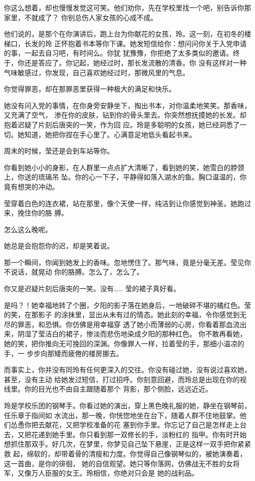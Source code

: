 		你这么想着，却也慢慢发觉这可笑。他们劝你，先在学校里找一个吧，别告诉你那家里，不就成了？
	你别总伤人家女孩的心成不成。

		他们说的，是那个在你演讲后，跑上台为你献花的女孩，玲。这一刻，在初冬的楼梯口，长发的玲
	正怀抱着书本等你下课。她发短信给你：想问问你关于入党申请的事，一起去自习吧，有时间么。你犹
	犹豫豫，你拒绝了太多类似的邀请。终于，你还是答应了。你记起，她经过时，那长发流散的清香。你
	没有这样对一种气味敏感过，你发现，自己喜欢她经过时，那微风里的气息。


		你觉得罪恶，却在那罪恶里获得一种极大的满足和快乐。


		她没有问入党的事情，在你身旁安静坐下，掏出书本，对你温柔地笑笑。那香味，又充满了空气，
	渗在你的皮肤，钻到你的骨头里去。你突然想抚摸她的长发。却抱着迟疑了片刻后唐突的一笑，作为回
	应。玲是多聪明的女孩，她已经洞悉了一切。她知道，她把你捏在手心里了。心满意足地低头看起书来。


		周末的时候，莹还是会到车站等你。

		你看到她小小的身影，在人群里一点点扩大清晰了，看到她的笑，她雪白的脖颈上，你送的琉璃吊
	坠。你的心一下子，平静得如落入湖水的鱼。胸口温温的，你竟有想哭的冲动。

		莹穿着白色的连衣裙，站在那里，像个天使一样，纯洁到让你感觉到神圣。她跑过来，挽住你的胳
	膊。

		怎么这么晚呢。

		她总是会抱怨你的迟，却是笑着说。

		那一个瞬间，你闻到她发上的香味。忽地愣住了。那气味，竟是分毫无差。莹见你不说话，就晃动
	你的胳膊。怎么了，怎么了。

		你又是迟疑片刻后唐突的一笑。没有…… 莹的裙子真好看。

		是吗？！她幸福地转了个圈，夕阳的影子落在她身后，一地破碎不堪的橘红色。莹的笑，在那影子
	的涂抹里，显出从未有过的情态。她此刻的幸福，令你感觉到无尽的罪恶，和恐惧。你仿佛是用幸福穿
	透了她小而薄弱的心房，你看着那血流出来，阴湿了莹洁白的裙子，惨淡而悲伤地染成夕阳的那种红色。
	你不敢再看她，她的笑，把你推向无可挽回的深渊。你像罪人一样，拉着莹的手，那细小温凉的手，一
	步步向那矮而疲倦的楼房挪去。


		而事实上，你并没有同玲有任何更深入的交往。你没有碰过她，没有说过喜欢她，甚至，没有主动
	给她发过短信，打过招呼。你刻意回避，而玲总是出现在你的视线里。你的目光也不由自主跟随着那个
	背影，那个侧脸，远远近近。

		玲是学校乐团的钢琴手。你看过她的演出，穿上黑色晚礼服的她，静坐在钢琴前，任乐章于指间如
	水流出，那一晚，你恍惚地坐在台下，随着人群不住地鼓掌。他们怂恿你把去献花，又把学校准备的花
	塞到你手里。你忘记了自己是怎样走上台去，又把花递到她手里。你只看到那一双修长的手，淡粉红的
	指甲。你有时开始想抓住那双手。好几次，在梦里，你梦见自己坠下悬崖，正是这样一双手把你紧紧救
	起，绵软的，却带着骨的清瘦和力度。你觉得自己像钢琴似的，被她演奏着，这一首曲，是你的徘徊，
	她的自信观望。她只等你落网，仿佛战无不胜的女将军，又像万人臣服的女王。玲相信，你绝对只会是
	她的战利品。


